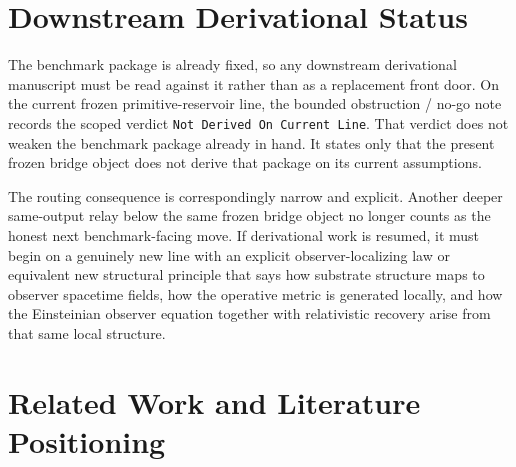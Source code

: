 \documentclass[11pt]{article}
\begin{document}
\section{Downstream Derivational Status}

The benchmark package is already fixed, so any downstream derivational manuscript must be read against it rather than as a replacement front door. On the current frozen primitive-reservoir line, the bounded obstruction / no-go note records the scoped verdict \texttt{Not Derived On Current Line}. That verdict does not weaken the benchmark package already in hand. It states only that the present frozen bridge object does not derive that package on its current assumptions.

The routing consequence is correspondingly narrow and explicit. Another deeper same-output relay below the same frozen bridge object no longer counts as the honest next benchmark-facing move. If derivational work is resumed, it must begin on a genuinely new line with an explicit observer-localizing law or equivalent new structural principle that says how substrate structure maps to observer spacetime fields, how the operative metric is generated locally, and how the Einsteinian observer equation together with relativistic recovery arise from that same local structure.

\section{Related Work and Literature Positioning}
\end{document}
